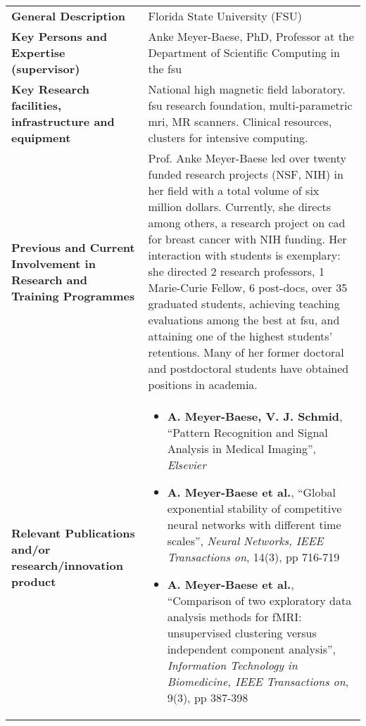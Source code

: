 {\fontsize{9bp}{1em}\selectfont
\noindent\begin{tabular}{>{\raggedright}p{}p{}}
  \multicolumn{2}{l}{\textbf{Partner Organisation Florida State University}} \\\midrule
\textbf{General Description} &
Florida State University (FSU)
\\\midrule
\textbf{Key Persons and Expertise (supervisor)} &
Anke Meyer-Baese, PhD, Professor at the Department of Scientific Computing in the \ac{fsu}
\\\midrule
\textbf{Key Research facilities, infrastructure and equipment} &
National high magnetic field laboratory. \ac{fsu} research foundation, multi-parametric \ac{mri}, MR scanners. Clinical resources, clusters for intensive computing.
\\\midrule
\textbf{Previous and Current Involvement in Research and Training Programmes} &
Prof. Anke Meyer-Baese led over twenty funded research projects (NSF, NIH) in her field with a total volume of six million dollars.
Currently, she directs among others, a research project on \ac{cad} for breast cancer with NIH funding.
Her interaction with students is exemplary: she directed 2 research professors, 1 Marie-Curie Fellow, 6 post-docs, over 35 graduated students, achieving teaching evaluations among the best at \ac{fsu}, and attaining one of the highest students' retentions. Many of her former doctoral and postdoctoral students have obtained positions in academia.
\\\midrule
\textbf{Relevant Publications and/or research/innovation product} &
\begin{itemize}[noitemsep]
\item \textbf{A. Meyer-Baese, V. J. Schmid}, ``Pattern Recognition and Signal Analysis in Medical Imaging'', \textit{Elsevier}
\item \textbf{A. Meyer-Baese et al.}, ``Global exponential stability of competitive neural networks with different time scales'', \textit{Neural Networks, IEEE Transactions on}, 14(3), pp 716-719
\item \textbf{A. Meyer-Baese et al.}, ``Comparison of two exploratory data analysis methods for fMRI: unsupervised clustering versus independent component analysis'', \textit{Information Technology in Biomedicine, IEEE Transactions on}, 9(3), pp 387-398
\end{itemize}
\\\bottomrule
\end{tabular}}

